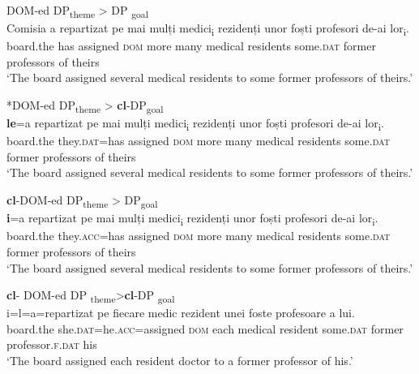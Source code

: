 \documentclass[output=paper,colorlinks,citecolor=brown,nonflat]{./langscibook}
\begin{document}
\ea%
    \label{ex:cornilescu:3}
    DOM-ed DP\textsubscript{theme} > DP \textsubscript{goal}\\
    \gll Comisia {a} {repartizat} {pe} {mai} {mulți} {medici\textsubscript{i}} {rezidenți} {unor} {foști} {profesori} {de-ai} {lor\textsubscript{i}}.\\
        board.the has assigned \textsc{dom} more many medical residents some.\textsc{dat} former professors of theirs\\
    \glt ‘The board assigned several medical residents to some former professors of theirs.’
    \z



\ea%
    \label{ex:cornilescu:4}
    *DOM-ed DP\textsubscript{theme} > \textbf{cl}-DP\textsubscript{goal}\\
     \textbf{{le}}{=a} {repartizat} {pe} {mai} {mulți} {medici\textsubscript{i}} {rezidenți} {unor} {foști} {profesori} {de-ai} {lor\textsubscript{i}}.\\
        board.the  they.\textsc{dat}=has assigned  \textsc{dom} more many medical residents some.\textsc{dat} former professors of theirs\\
    \glt ‘The board assigned several medical residents to some former professors of theirs.’
    \z

          

\ea%
    \label{ex:cornilescu:5}
    \textbf{cl}-DOM-ed DP\textsubscript{theme} > DP\textsubscript{goal}\\
     \textbf{{i}}{=a} {repartizat} {pe} {mai} mulți {medici\textsubscript{i}} {rezidenți} {unor} {foști} {profesori} {de-ai} {lor\textsubscript{i}}.\\
		board.the they.\textsc{acc=}has assigned \textsc{dom} more many medical residents some.\textsc{dat} former professors of theirs\\        
    \glt ‘The board assigned several medical residents to some former professors of theirs.’
    \z




\ea%
    \label{ex:cornilescu:6}
    \textbf{cl}- DOM-ed DP \textsubscript{theme}>\textbf{cl}{}-DP \textsubscript{goal} \\
     {i=l=a=repartizat} {pe} {fiecare} {medic} {rezident} {unei} {foste} {profesoare} {a} {lui}.\\
       board.the she.\textsc{dat}=he.\textsc{acc}=assigned \textsc{dom} each medical resident some.\textsc{dat} former professor.\textsc{f}.\textsc{dat}  his\\
    \glt ‘The board assigned each resident doctor to a former professor of his.’
    \z
\end{document}
